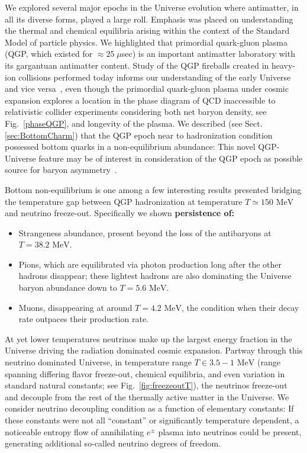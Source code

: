 \documentclass[universe,article,submit,moreauthors,pdftex,a4paper]{Definitions/mdpi}
\newcommand{\MeV}{\text{ MeV}}
\newcommand*{\rf}[1]{Fig.~{\ref{#1}}}
\newcommand*{\rsec}[1]{Sect.\,{\ref{#1}}}
\begin{document}
We explored several major epochs in the Universe evolution where antimatter, in all its diverse forms, played a large roll. Emphasis was placed on understanding the thermal and chemical equilibria arising within the context of the Standard Model of particle physics. We highlighted that primordial quark-gluon plasma (QGP, which existed for $\approx 25\;\mu$sec) is an important antimatter laboratory with its gargantuan antimatter content. Study of the QGP fireballs created in heavy-ion collisions performed today informs our understanding of the early Universe and vice versa~\cite{Borsanyi:2016ksw,Rafelski:2013qeu,Petran:2013lja,Philipsen:2012nu}, even though the primordial quark-gluon plasma under cosmic expansion explores a location in the phase diagram of QCD inaccessible to relativistic collider experiments considering both net baryon density, see \rf{phaseQGP}, and longevity of the plasma. We described (see \rsec{sec:BottomCharm}) that the QGP epoch near to hadronization condition possessed bottom quarks in a non-equilibrium abundance: This novel QGP-Universe feature may be of interest in consideration of the QGP epoch as possible source for baryon asymmetry~\cite{Yang:2020nne}. 

Bottom non-equilibrium is one among a few interesting results presented bridging the temperature gap between QGP hadronization at temperature $T\simeq150\MeV$ and neutrino freeze-out. Specifically we shown {\bf persistence of:}
 \begin{itemize}
 \item Strangeness abundance, present beyond the loss of the antibaryons at $T=38.2\MeV$.
 \item Pions, which are equilibrated via photon production long after the other hadrons disappear; these lightest hadrons are also dominating the Universe baryon abundance down to $T=5.6\MeV$.
 \item Muons, disappearing at around $T=4.2\MeV$, the condition when their decay rate outpaces their production rate.
 \end{itemize}

At yet lower temperatures neutrinos make up the largest energy fraction in the Universe driving the radiation dominated cosmic expansion. Partway through this neutrino dominated Universe, in temperature  range $T\in 3.5-1\MeV$ (range spanning differing flavor freeze-out, chemical equilibria, and even variation in  standard natural constants; see \rf{fig:freezeoutT}), the neutrinos freeze-out and decouple from the rest of the thermally active matter in the Universe. We consider neutrino decoupling condition as a function of elementary constants: If these constants were not all ``constant'' or significantly temperature dependent, a noticeable entropy flow of annihilating $e^{\pm}$ plasma into neutrinos could be present, generating additional so-called neutrino degrees of freedom.
\end{document}
